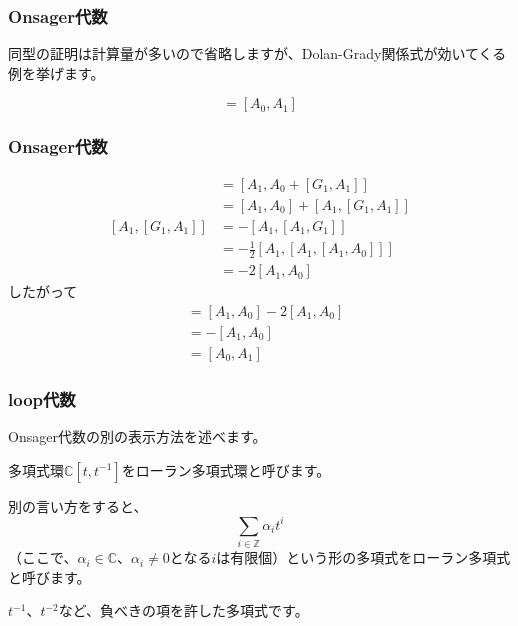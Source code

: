 \documentclass{beamer}
\begin{document}
\begin{frame}
    \frametitle{Onsager代数}

    同型の証明は計算量が多いので省略しますが、Dolan-Grady関係式が効いてくる例を挙げます。

    \begin{lemma}
        \begin{equation}
            [A_1,A_2]=[A_0,A_1]
        \end{equation}
    \end{lemma}
\end{frame}

\begin{frame}
    \frametitle{Onsager代数}

    \begin{align}
        [A_1,A_2]       & =[A_1,A_0+[G_1,A_1]]                \\
                        & = [A_1,A_0]+[A_1,[G_1,A_1]]         \\
        [A_1,[G_1,A_1]] & =-[A_1,[A_1,G_1]]                   \\
                        & = -\frac{1}{2}[A_1,[A_1,[A_1,A_0]]] \\
                        & = -2[A_1,A_0]
    \end{align}
    したがって
    \begin{align}
        [A_1,A_2] & = [A_1,A_0]-2[A_1,A_0] \\
                  & = -[A_1,A_0]           \\
                  & = [A_0,A_1]
    \end{align}
\end{frame}

\begin{frame}
    \frametitle{loop代数}

    Onsager代数の別の表示方法を述べます。

    \bigskip

    \begin{definition}[ローラン多項式]
        多項式環$ℂ[t,t^{-1}]$をローラン多項式環と呼びます。

        別の言い方をすると、
        \begin{equation}
            ∑_{i∈ℤ}α_it^i
        \end{equation}
        （ここで、$α_i∈ℂ$、$α_i≠0$となる$i$は有限個）という形の多項式をローラン多項式と呼びます。
    \end{definition}

    $t^{-1}$、$t^{-2}$など、負べきの項を許した多項式です。
\end{frame}
\end{document}
